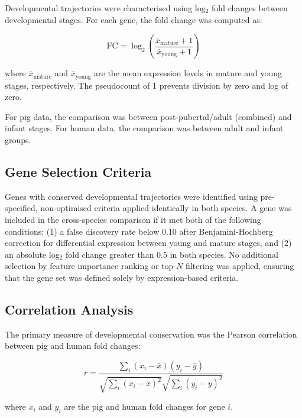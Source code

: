 Developmental trajectories were characterised using log$_2$ fold changes between developmental stages. For each gene, the fold change was computed as:

\begin{equation}
    \text{FC} = \log_2\left(\frac{\bar{x}_{\text{mature}} + 1}{\bar{x}_{\text{young}} + 1}\right)
    \label{eq:fold_change}
\end{equation}

where $\bar{x}_{\text{mature}}$ and $\bar{x}_{\text{young}}$ are the mean expression levels in mature and young stages, respectively. The pseudocount of 1 prevents division by zero and log of zero.

For pig data, the comparison was between post-pubertal/adult (combined) and infant stages. For human data, the comparison was between adult and infant groups.

\subsection{Gene Selection Criteria}

Genes with conserved developmental trajectories were identified using pre-specified, non-optimised criteria applied identically in both species. A gene was included in the cross-species comparison if it met both of the following conditions: (1) a false discovery rate below 0.10 after Benjamini-Hochberg correction \parencite{benjamini_controlling_1995} for differential expression between young and mature stages, and (2) an absolute log$_2$ fold change greater than 0.5 in both species. No additional selection by feature importance ranking or top-$N$ filtering was applied, ensuring that the gene set was defined solely by expression-based criteria.

\subsection{Correlation Analysis}

The primary measure of developmental conservation was the Pearson correlation between pig and human fold changes:

\begin{equation}
    r = \frac{\sum_i (x_i - \bar{x})(y_i - \bar{y})}{\sqrt{\sum_i (x_i - \bar{x})^2} \sqrt{\sum_i (y_i - \bar{y})^2}}
    \label{eq:pearson}
\end{equation}

where $x_i$ and $y_i$ are the pig and human fold changes for gene $i$.

